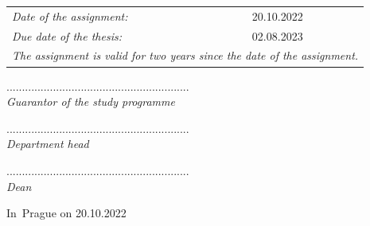\documentclass[11pt,a4paper]{article}
\begin{document}
\hspace{-1ex}\begin{tabular}{ll}
{\it Date of the assignment:}      & 20.10.2022\\[1mm]
{\it Due date of the thesis:}  & 02.08.2023\\[1mm]
\multicolumn{2}{l}{\it The assignment is valid for two years since the date of the assignment.}
\end{tabular}

\vspace{4ex}

\parbox{0.40\textwidth}{%
\begin{center}
...........................................................\\
  {\it Guarantor of the study programme}
\end{center}
}

\vspace{2ex}

\parbox{0.40\textwidth}{%
\begin{center}
...........................................................\\
  {\it Department head}
\end{center}
}
\qquad\qquad
\parbox{0.40\textwidth}{%
\begin{center}
...........................................................\\
  {\it Dean}
\end{center}
}

\vspace{2ex}

In~Prague on 20.10.2022
\end{document}
